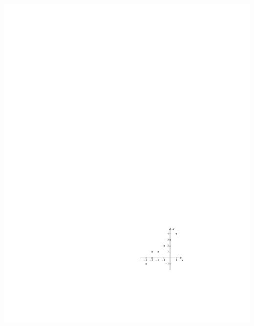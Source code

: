 \documentclass{ximera}
\begin{document}
\begin{exercise}
\begin{selectAll}
{\begin{image}
\includegraphics{WiaFgraphs1-2.pdf}
\end{image}
}
\end{selectAll}
\end{exercise}
\end{document}
